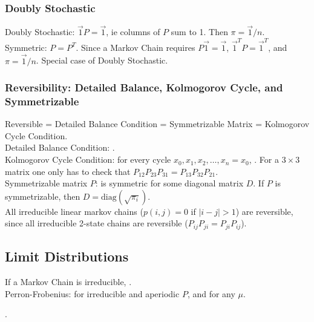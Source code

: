 \documentclass{article}
\begin{document}
\subsubsection{Doubly Stochastic}
Doubly Stochastic: $\vec{1} P = \vec{1}$, ie columns of $P$ sum to 1. Then $\pi = \vec{1} / n$. \\

Symmetric: $P = P^T$. Since a Markov Chain requires $P \vec{1} = \vec{1}$, $\vec{1}^T P = \vec{1}^T$, and $\pi = \vec{1} / n$. Special case of Doubly Stochastic. 

\subsubsection{Reversibility: Detailed Balance, Kolmogorov Cycle, and Symmetrizable}
Reversible = Detailed Balance Condition = Symmetrizable Matrix = Kolmogorov Cycle Condition. \\

Detailed Balance Condition: . \\

Kolmogorov Cycle Condition: for every cycle $x_0, x_1, x_2, \dots, x_n = x_0$, . For a $3 \times 3$ matrix one only has to check that $P_{12} P_{23} P_{31} = P_{13} P_{32} P_{21}$.\\

Symmetrizable matrix $P$:  is symmetric for some diagonal matrix $D$. If $P$ is symmetrizable, then $D = \text{diag}(\sqrt{\pi_i})$. \\

All irreducible linear markov chains ($p(i, j) = 0$ if $|i-j| > 1$) are reversible, since all irreducible 2-state chains are reversible ($P_{ij} P_{ji} = P_{ji} P_{ij}$).


\subsection{Limit Distributions}
If a Markov Chain is irreducible, . \\

Perron-Frobenius: for irreducible and aperiodic $P$,  and  for any $\mu$.

. \\
\end{document}
